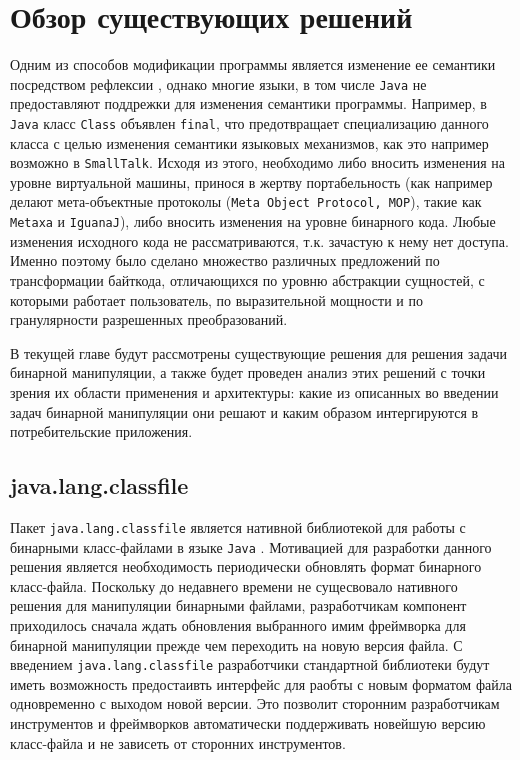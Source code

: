 \section{Обзор существующих решений}
\label{sec:Chapter2} 

\sloppy

Одним из способов модификации программы является изменение ее семантики посредством рефлексии \cite{compReflection}, однако многие языки, в том числе \texttt{Java} не предоставляют поддрежки для изменения семантики программы. Например, в \texttt{Java} класс \texttt{Class} объявлен \texttt{final}, что предотвращает специализацию данного класса с целью изменения семантики языковых механизмов, как это например возможно в \texttt{SmallTalk}. Исходя из этого, необходимо либо вносить изменения на уровне виртуальной машины, принося в жертву портабельность (как например делают мета-объектные протоколы (\texttt{Meta~Object~Protocol,~MOP}), такие как \texttt{Metaxa} и \texttt{IguanaJ}), либо вносить изменения на уровне бинарного кода. Любые изменения исходного кода не рассматриваются, т.к. зачастую к нему нет доступа. Именно поэтому было сделано множество различных предложений по трансформации байткода, отличающихся по уровню абстракции сущностей, с которыми работает пользователь, по выразительной мощности и по гранулярности разрешенных преобразований.

В текущей главе будут рассмотрены существующие решения для решения задачи бинарной манипуляции, а также будет проведен анализ этих решений с точки зрения их области применения и архитектуры: какие из описанных во введении задач бинарной манипуляции они решают и каким образом интергируются в потребительские приложения.

\subsection{java.lang.classfile}

Пакет \texttt{java.lang.classfile} является нативной библиотекой для работы с бинарными класс-файлами в языке \texttt{Java} \cite{lavaLangClassfile}. Мотивацией для разработки данного решения является необходимость периодически обновлять формат бинарного класс-файла. Поскольку до недавнего времени не сущесвовало нативного решения для манипуляции бинарными файлами, разработчикам компонент приходилось сначала ждать обновления выбранного имим фреймворка для бинарной манипуляции прежде чем переходить на новую версия файла. С введением \texttt{java.lang.classfile} разработчики стандартной библиотеки будут иметь возможность предостаивть интерфейс для раобты с новым форматом файла одновременно с выходом новой версии. Это позволит сторонним разработчикам инструментов и фреймворков автоматически поддерживать новейшую версию класс-файла и не зависеть от сторонних инструментов.

